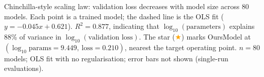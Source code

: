 \caption{Chinchilla-style scaling law: validation loss decreases with model size across 80 models.
Each point is a trained model; the dashed line is the OLS fit ($y = -0.045x + 0.621$).
\textbf{$R^2 = 0.877$}, indicating that $\log_{10}(\text{parameters})$ explains 88\% of variance in $\log_{10}(\text{validation loss})$.
The star (\textcolor{orange}{$\bigstar$}) marks OursModel at $(\log_{10}\!\text{params}=9.449,\ \text{loss}=0.210)$, nearest the target operating point.
$n=80$ models; OLS fit with no regularisation; error bars not shown (single-run evaluations).}
